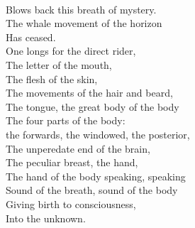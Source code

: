 \documentclass[smalldemyvopaper,11pt,twoside,onecolumn,openright,extrafontsizes]{memoir}
\begin{document}
\\Blows back this breath of mystery.
\\The whale movement of the horizon
\\Has ceased.
\\One longs for the direct rider,
\\The letter of the mouth,
\\The flesh of the skin,
\\The movements of the hair and beard,
\\The tongue, the great body of the body
\\The four parts of the body:
\\the forwards, the windowed, the posterior,
\\The unperedate end of the brain,
\\The peculiar breast, the hand,
\\The hand of the body speaking, speaking
\\Sound of the breath, sound of the body
\\Giving birth to consciousness,
\\Into the unknown.
\end{document}
